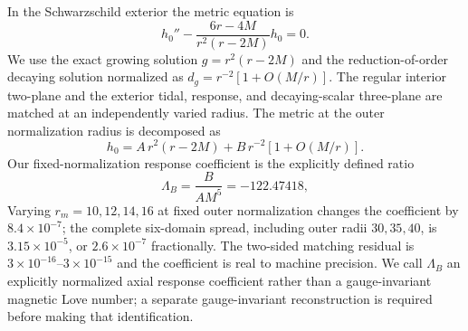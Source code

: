 In the Schwarzschild exterior the metric equation is
\begin{equation}
h_0''-\frac{6r-4M}{r^2(r-2M)}h_0=0.
\end{equation}
We use the exact growing solution $g=r^2(r-2M)$ and the reduction-of-order
decaying solution normalized as $d_g=r^{-2}[1+O(M/r)]$. The regular interior
two-plane and the exterior tidal, response, and decaying-scalar three-plane are
matched at an independently varied radius. The metric at the outer
normalization radius is decomposed as
\begin{equation}
h_0=A\,r^2(r-2M)+B\,r^{-2}[1+O(M/r)].
\end{equation}
Our fixed-normalization response coefficient is the explicitly defined ratio
\begin{equation}
\Lambda_B=\frac{B}{A M^5}=-122.47418,
\label{eq:static-axial-response}
\end{equation}
Varying $r_m=10,12,14,16$ at fixed outer normalization changes the coefficient
by $8.4\times10^{-7}$; the complete six-domain spread, including outer radii
$30,35,40$, is $3.15\times10^{-5}$, or $2.6\times10^{-7}$ fractionally. The
two-sided matching residual is $3\times10^{-16}$--$3\times10^{-15}$ and the
coefficient is real to machine precision. We call $\Lambda_B$ an explicitly
normalized axial response coefficient rather than a gauge-invariant magnetic
Love number; a separate gauge-invariant reconstruction is required before
making that identification.
